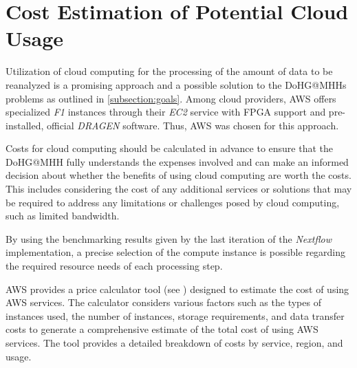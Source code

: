 \section{Cost Estimation of Potential Cloud Usage}\label{sec:awscostestimation}

Utilization of cloud computing for the processing of the amount of data to be reanalyzed is a promising approach and a possible solution to the \ac{DoHG@MHH}s problems as outlined in \cref{subsection:goals}. Among cloud providers, \ac{AWS} offers specialized \textit{F1} instances through their \textit{\ac{EC2}} service with \ac{FPGA} support and pre-installed, official \textit{DRAGEN} software. Thus, \ac{AWS} was chosen for this approach.

Costs for cloud computing should be calculated in advance to ensure that the \ac{DoHG@MHH} fully understands the expenses involved and can make an informed decision about whether the benefits of using cloud computing are worth the costs. This includes considering the cost of any additional services or solutions that may be required to address any limitations or challenges posed by cloud computing, such as limited bandwidth.

By using the benchmarking results given by the last iteration of the \textit{Nextflow} implementation, a precise selection of the compute instance is possible regarding the required resource needs of each processing step.

\Ac{AWS} provides a price calculator tool (see \autocite{AmazonWebServices2023}) designed to estimate the cost of using \ac{AWS} services. The calculator considers various factors such as the types of instances used, the number of instances, storage requirements, and data transfer costs to generate a comprehensive estimate of the total cost of using \ac{AWS} services. The tool provides a detailed breakdown of costs by service, region, and usage.

